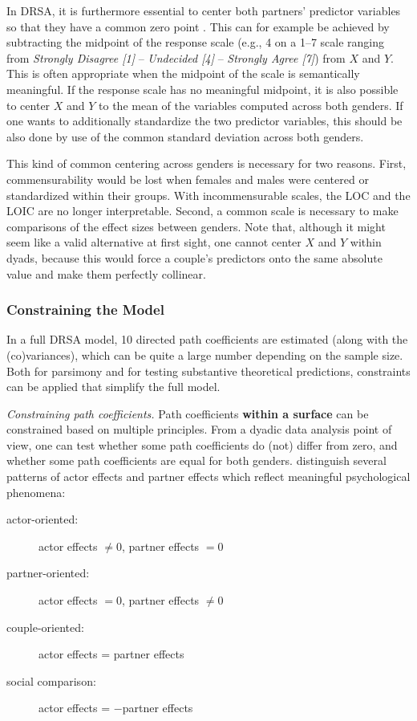 \documentclass[jou,a4paper,draftfirst]{apa6}
\newcommand{\added}[1]{\textcolor{colour_added}{\bf{#1}}}
\begin{document}
In DRSA, it is furthermore essential to center both partners' predictor variables so that they have a common zero point \parencite{kenny_partner_1999,kenny_dyadic_2006}. This can for example be achieved by subtracting the midpoint of the response scale (e.g., 4 on a 1--7 scale ranging from \textit{Strongly Disagree [1]} -- \textit{Undecided [4]} -- \textit{Strongly Agree [7]}) from $X$ and $Y$. This is often appropriate when the midpoint of the scale is semantically meaningful.
If the response scale has no meaningful midpoint, it is also possible to center $X$ and $Y$ to the mean of the variables computed across both genders. If one wants to additionally standardize the two predictor variables, this should be also done by use of the common standard deviation across both genders. 

This kind of common centering across genders is necessary for two reasons. First, commensurability would be lost when females and males were centered or standardized within their groups. With incommensurable scales, the LOC and the LOIC are no longer interpretable. Second, a common scale is necessary to make comparisons of the effect sizes between genders. Note that, although it might seem like a valid alternative at first sight, one cannot center $X$ and $Y$ within dyads, because this would force a couple’s predictors onto the same absolute value and make them perfectly collinear.

\subsubsection{Constraining the Model}
In a full DRSA model, 10 directed path coefficients are estimated (along with the (co)variances), which can be quite a large number depending on the sample size. Both for parsimony and for testing substantive theoretical predictions, constraints can be applied that simplify the full model.

\emph{Constraining path coefficients.}
Path coefficients \added{within a surface} can be constrained based on multiple principles. From a dyadic data analysis point of view, one can test whether some path coefficients do (not) differ from zero, and whether some path coefficients are equal for both genders. \textcite{kenny_partner_1999} distinguish several patterns of actor effects and partner effects which reflect meaningful psychological phenomena:

\begin{description}
	\item[actor-oriented:] actor effects $\neq 0$, partner effects $= 0$
	\item[partner-oriented:] actor effects $= 0$, partner effects $\neq 0$
	\item[couple-oriented:] actor effects = partner effects
	\item[social comparison:] actor effects = $-$partner effects
\end{description}
\end{document}
